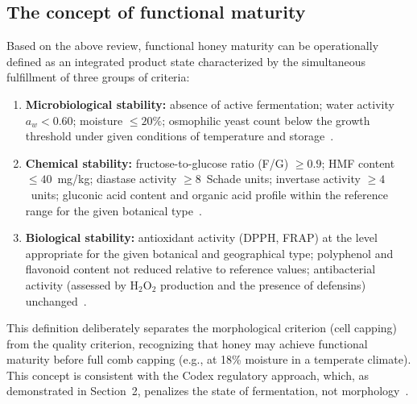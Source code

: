 \subsection{The concept of functional maturity}
Based on the above review, functional honey maturity can be operationally defined as an integrated product state characterized by the simultaneous fulfillment of three groups of criteria:

\begin{enumerate}
    \item \textbf{Microbiological stability:} absence of active
          fermentation; water activity $a_w < 0.60$; moisture
          $\leq 20\%$; osmophilic yeast count below the growth
          threshold under given conditions of temperature
          and storage~\cite{zamora2006}.

    \item \textbf{Chemical stability:} fructose-to-glucose ratio
          (F/G) $\geq 0.9$; HMF content $\leq 40$~mg/kg;
          diastase activity $\geq 8$~Schade units; invertase
          activity $\geq 4$~units; gluconic acid content and
          organic acid profile within the reference range
          for the given botanical type~\cite{codex_stan12,zhang2021}.

    \item \textbf{Biological stability:} antioxidant activity
          (DPPH, FRAP) at the level appropriate for the given
          botanical and geographical type; polyphenol and flavonoid
          content not reduced relative to reference values;
          antibacterial activity (assessed by H$_2$O$_2$ production
          and the presence of defensins)
          unchanged~\cite{guo2020}.
\end{enumerate}

This definition deliberately separates the morphological criterion
(cell capping) from the quality criterion, recognizing that honey
may achieve functional maturity before full comb capping (e.g., at
18\% moisture in a temperate climate). This concept is consistent
with the Codex regulatory approach, which, as demonstrated in
Section~2, penalizes the state of fermentation, not
morphology~\cite{codex_stan12,sun2021}.
